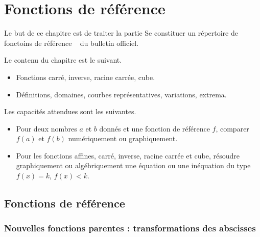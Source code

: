 
\chapter{Fonctions de référence}

Le but de ce chapitre est de traiter la partie \og Se constituer un répertoire de fonctoins de référence \fg~ du bulletin officiel.

Le contenu du chapitre est le suivant.
	\begin{itemize}
		\item Fonctions carré, inverse, racine carrée, cube.
		\item Définitions, domaines, courbes représentatives, variations, extrema.
	\end{itemize}

Les capacités attendues sont les suivantes.
	\begin{itemize}
		\item Pour deux nombres $a$ et $b$ donnés et une fonction de référence $f$, comparer $f(a)$ et $f(b)$ numériquement ou graphiquement.
		\item Pour les fonctions affines, carré, inverse, racine carrée et cube, résoudre graphiquement ou algébriquement une équation ou une inéquation du type $f(x) = k$, $f(x) < k$.
	\end{itemize}

\section{Fonctions de référence}

\subsection{Nouvelles fonctions parentes : transformations des abscisses}

